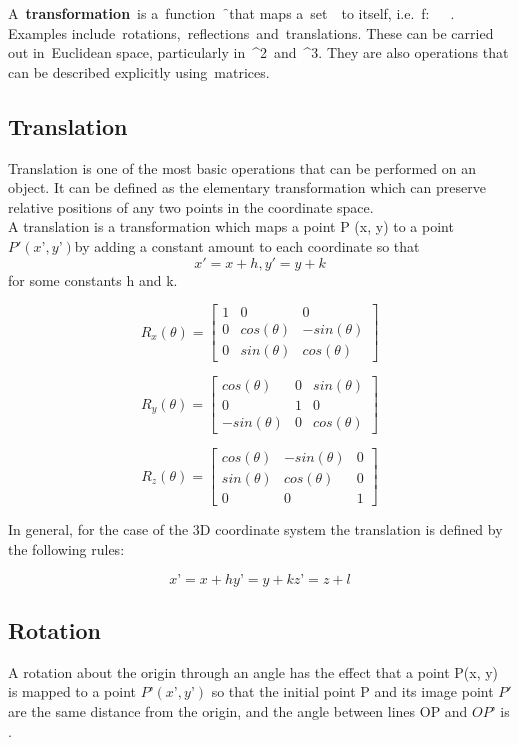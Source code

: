 \documentclass[12pt]{report}
\begin{document}
A \textbf{transformation} is a function \f that maps a set \chi to itself, i.e. f: \chi \rightarrow \chi. Examples include rotations, reflections and translations. These can be carried out in Euclidean space, particularly in ^2 and ^3. They are also operations that can be described explicitly using matrices.

\subsection{Translation}
Translation is one of the most basic operations that can be performed on an object. It can be defined as the elementary transformation which can preserve relative positions of any two points in the coordinate space. 
\vspace{0.3cm}
\\
A translation is a transformation which maps a point P (x, y) to a point $ P' (x’ , y’) $by adding a constant amount to each coordinate so that 
\[ x' = x + h, y' = y + k \] for some constants h and k.

\[ R_{x}(\theta) = \begin{bmatrix}
1 & 0 & 0 \\
0 & cos(\theta) & -sin(\theta) \\
0 & sin(\theta) & cos(\theta) 
\end{bmatrix} \]


\[ R_{y}(\theta) = \begin{bmatrix}
cos(\theta) & 0 & sin(\theta) \\
0 & 1 & 0 \\
-sin(\theta) & 0 & cos(\theta) 
\end{bmatrix} \]


\[ R_{z}(\theta) = \begin{bmatrix}
cos(\theta) & -sin(\theta) & 0 \\
sin(\theta) & cos(\theta) & 0 \\
0 & 0 & 1 
\end{bmatrix} \]

In general, for the case of the 3D coordinate system the translation is defined by the following rules:

\[ 		x’ = x + h	y’ = y + k	z’ = z + l  \]

\subsection{Rotation}

A rotation about the origin through an angle \theta has the effect that a point P(x, y) is mapped to a point $ P’ (x’ , y’) $ so that the initial point P and its image point $ P' $ are the same distance from the origin, and the angle between lines OP and $ OP’ $ is \theta.
\vspace{0.3cm}
\end{document}
